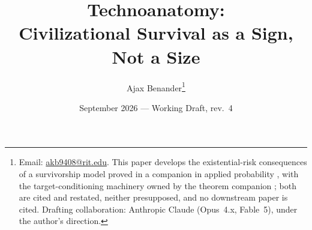 \begin{filecontents}[overwrite]{tech_refs.bib}
  publisher = {Oxford University Press},
  year      = {2022}
}
@book{Ord20,
  author    = {Ord, Toby},
  title     = {The Precipice: Existential Risk and the Future of Humanity},
  publisher = {Bloomsbury},
  address   = {London},
  year      = {2020}
}
@book{Parfit84,
  author    = {Parfit, Derek},
  title     = {Reasons and Persons},
  publisher = {Oxford University Press},
  address   = {Oxford},
  year      = {1984}
}
@misc{Plutarch,
  author       = {Plutarch},
  title        = {Whether Land or Sea Animals Are Cleverer (\emph{De sollertia animalium}), in \emph{Moralia}},
  howpublished = {Classical source, cited by section},
  note         = {\S7; the saying is attributed there to Bion of Borysthenes.}
}
@misc{Torres21,
  author       = {Torres, {\'E}mile P.},
  title        = {Against longtermism},
  howpublished = {Aeon},
  year         = {2021}
}
\end{filecontents}
\documentclass[11pt]{article}
\usepackage[margin=1.1in]{geometry}
\usepackage{amsmath,amssymb,amsthm,mathtools}
\usepackage{booktabs,graphicx,enumitem,url,xcolor}
\usepackage[colorlinks=true,linkcolor=blue!50!black,citecolor=blue!50!black,urlcolor=blue!50!black]{hyperref}
\usepackage[style=numeric, sorting=none]{biblatex}



\renewcommand*{\bibfont}{\small}
\newcommand{\E}{\mathbb{E}}
\newcommand{\PP}{\mathbb{P}}
\newcommand{\R}{\mathbb{R}}
\DeclareMathOperator{\Var}{Var}
\DeclareMathOperator{\Cov}{Cov}
\DeclareMathOperator{\Leb}{Leb}
\newcommand{\eqd}{\overset{d}{=}}
\newcommand{\one}{\mathbf{1}}
\newcommand{\Imm}{\mathcal{I}}
\newcommand{\Fc}{\mathcal{F}}
\newcommand{\Lc}{\mathcal{L}}
\newcommand{\hm}{\mathfrak{h}}
\newcommand{\Ac}{\mathcal{A}}
\newcommand{\Sc}{\mathsf{S}}
\theoremstyle{plain}
\newtheorem{theorem}{Theorem}[section]
\newtheorem{proposition}[theorem]{Proposition}
\newtheorem{lemma}[theorem]{Lemma}
\newtheorem{corollary}[theorem]{Corollary}
\newtheorem{claim}[theorem]{Claim}
\theoremstyle{definition}
\newtheorem{definition}[theorem]{Definition}
\newtheorem{ansatz}[theorem]{Ansatz}
\newtheorem{convention}[theorem]{Convention}
\newtheorem{constraint}{Constraint}
\newtheorem{principle}{Principle}
\newtheorem{example}[theorem]{Example}
\newtheorem{premise}{Premise}
\newtheorem{objection}[theorem]{Objection}
\renewcommand{\thepremise}{$\Phi$\arabic{premise}}
\theoremstyle{remark}
\newtheorem{remark}[theorem]{Remark}
\title{Technoanatomy:\\ \large Civilizational Survival as a Sign, Not a Size}
\author{Ajax Benander\thanks{Email:
\href{mailto:akb9408@rit.edu}{akb9408@rit.edu}. This paper develops the
existential-risk consequences of a survivorship model proved in a companion in
applied probability \cite{GoldenSurvivorship}, with the target-conditioning
machinery owned by the theorem companion \cite{GoldenTargeted}; both are
cited and restated, neither presupposed, and no downstream paper is
cited. Drafting
collaboration: Anthropic Claude (Opus~4.x, Fable~5), under the author's
direction.}}
\date{September 2026 --- Working Draft, rev.~4}

